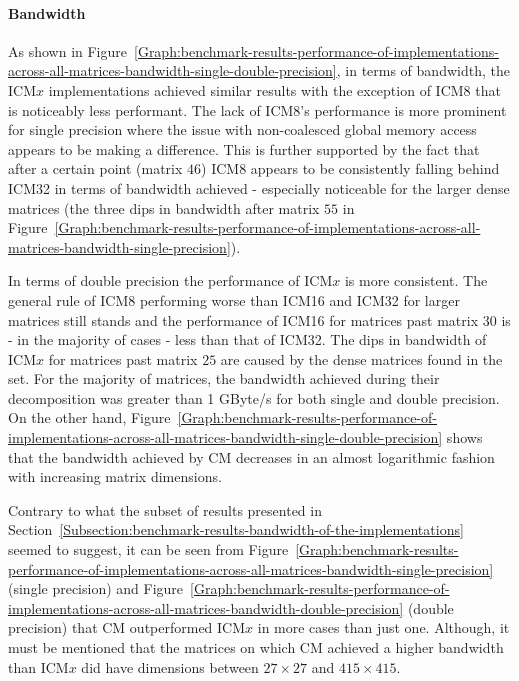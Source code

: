 \paragraph{Bandwidth} As shown in Figure~\ref{Graph:benchmark-results-performance-of-implementations-across-all-matrices-bandwidth-single-double-precision}, in terms of bandwidth, the ICM$ x $ implementations achieved similar results with the exception of ICM8 that is noticeably less performant. The lack of ICM8's performance is more prominent for single precision where the issue with non-coalesced global memory access appears to be making a difference. This is further supported by the fact that after a certain point (matrix $ 46 $) ICM8 appears to be consistently falling behind ICM32 in terms of bandwidth achieved - especially noticeable for the larger dense matrices (the three dips in bandwidth after matrix $ 55 $ in Figure~\ref{Graph:benchmark-results-performance-of-implementations-across-all-matrices-bandwidth-single-precision}).
\par In terms of double precision the performance of ICM$ x $ is more consistent. The general rule of ICM8 performing worse than ICM16 and ICM32 for larger matrices still stands and the performance of ICM16 for matrices past matrix $ 30 $ is - in the majority of cases - less than that of ICM32. The dips in bandwidth of ICM$ x $ for matrices past matrix $ 25 $ are caused by the dense matrices found in the set. For the majority of matrices, the bandwidth achieved during their decomposition was greater than 1 GByte/s for both single and double precision. On the other hand, Figure~\ref{Graph:benchmark-results-performance-of-implementations-across-all-matrices-bandwidth-single-double-precision} shows that the bandwidth achieved by CM decreases in an almost logarithmic fashion with increasing matrix dimensions.
\par Contrary to what the subset of results presented in Section~\ref{Subsection:benchmark-results-bandwidth-of-the-implementations} seemed to suggest, it can be seen from Figure~\ref{Graph:benchmark-results-performance-of-implementations-across-all-matrices-bandwidth-single-precision} (single precision) and Figure~\ref{Graph:benchmark-results-performance-of-implementations-across-all-matrices-bandwidth-double-precision} (double precision) that CM outperformed ICM$ x $ in more cases than just one. Although, it must be mentioned that the matrices on which CM achieved a higher bandwidth than ICM$ x $ did have dimensions between $ 27\times 27 $ and $ 415\times 415 $.

